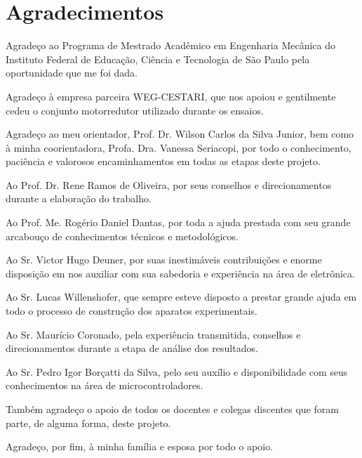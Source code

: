 \documentclass[
	12pt,				
	oneside,			
	a4paper,			
	english,			
	brazil,			
	]{abntex2ppgsi}
\begin{document}
\frenchspacing 



\imprimircapa

\imprimirfolhaderosto

\chapter*{Agradecimentos}

Agradeço ao Programa de Mestrado Acadêmico em Engenharia Mecânica do Instituto Federal de Educação, Ciência e Tecnologia de São Paulo pela oportunidade que me foi dada. 

Agradeço à empresa parceira WEG-CESTARI, que nos apoiou e gentilmente cedeu o conjunto motorredutor utilizado durante os ensaios.

Agradeço ao meu orientador, Prof. Dr. Wilson Carlos da Silva Junior, bem como à minha coorientadora, Profa. Dra. Vanessa Seriacopi, por todo o conhecimento, paciência e valorosos encaminhamentos em todas as etapas deste projeto.

Ao Prof. Dr. Rene Ramos de Oliveira, por seus conselhos e direcionamentos durante a elaboração do trabalho.

Ao Prof. Me. Rogério Daniel Dantas, por toda a ajuda prestada com seu grande arcabouço de conhecimentos técnicos e metodológicos. 

Ao Sr. Victor Hugo Deuner, por suas inestimáveis contribuições e enorme disposição em nos auxiliar com sua sabedoria e experiência na área de eletrônica. 

Ao Sr. Lucas Willenshofer, que sempre esteve disposto a prestar grande ajuda em todo o processo de construção dos aparatos experimentais.

Ao Sr. Maurício Coronado, pela experiência transmitida, conselhos e direcionamentos durante a etapa de análise dos resultados. 

Ao Sr. Pedro Igor Borçatti da Silva, pelo seu auxílio e disponibilidade com seus conhecimentos na área de microcontroladores. 

Também agradeço o apoio de todos os docentes e colegas discentes que foram parte, de alguma forma, deste projeto.

Agradeço, por fim, à minha família e esposa por todo o apoio.
\end{document}
